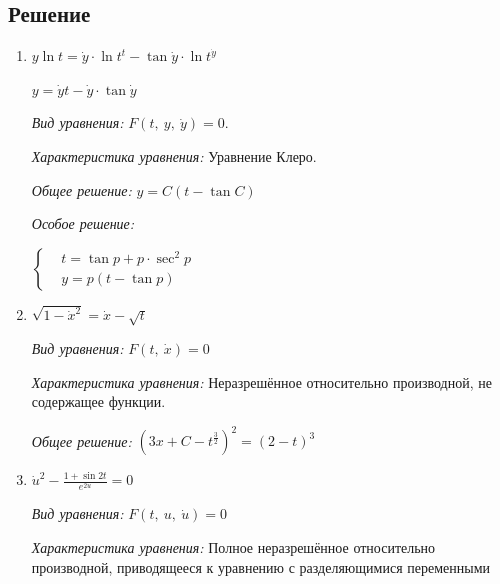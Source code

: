 \documentclass[14pt, titlepage, a4paper, fleqn]{extarticle}
\begin{document}
        \subsection{Решение}
            \begin{enumerate}
                \item \(y \ln{t}  = \dot{y} \cdot \ln{t^t} - \tan{\dot{y}} \cdot 
                \ln{t^{\dot{y}}}\)

                    \(y = \dot{y}t - \dot{y} \cdot \tan{\dot{y}}\)

                    \textit{Вид уравнения:} 
                        \(F(t, ~ y, ~ \dot{y}) = 0\).

                    \textit{Характеристика уравнения:}
                        Уравнение Клеро.

                    \textit{Общее решение:} 
                        \(y = C(t - \tan{C})\)

                    \textit{Особое решение:}

                        \(
                        \left\lbrace
                        \begin{aligned}
                                &t = \tan{p} + p \cdot \sec^2{p}\\
                                &y = p(t - \tan{p})
                        \end{aligned}
                        \right . 
                        \)

                \item \(\sqrt{1 - \dot{x}^2} = \dot{x} - \sqrt{t}\)
                
                    \textit{Вид уравнения:} 
                        \(F(t, ~ \dot{x}) = 0\)

                    \textit{Характеристика уравнения:} 
                        Неразрешённое относительно производной, не содержащее функции.

                    \textit{Общее решение:}
                    \(\displaystyle \left(3x + C - t^{\frac{3}{2}}\right)^2 = (2 - t)^3\)

                \item \(\displaystyle \dot{u}^2 - \frac{1 + \sin{2t}}{e^{2u}} = 0\)
                
                        \textit{Вид уравнения:} 
                            \(F(t, ~ u, ~ \dot{u}) = 0\)

                        \textit{Характеристика уравнения:}
                            Полное неразрешённое относительно производной, приводящееся к уравнению с разделяющимися переменными
                            

\end{enumerate}
\end{document}
